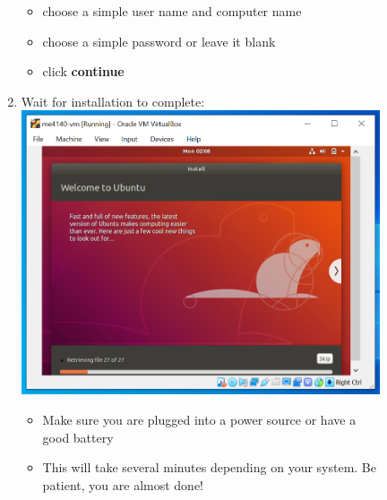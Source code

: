 \documentclass[12pt]{article}
\begin{document}
\begin{description}
\begin{description}
\begin{enumerate}
\begin{itemize}
				 \item choose a simple user name and computer name
				 \item choose a simple password or leave it blank
				 \item click {\bf continue}
                     
            \end{itemize}
\newpage
\item Wait for installation to complete: \vspace{5mm} \\
      		\hspace*{-2.5cm}\includegraphics[scale=.6]{Capture20.png}
            \begin{itemize}
            \item  Make sure you are plugged into a power source or have a good battery
        \item  This will take several minutes depending on your system. Be patient, you are almost done! \vspace{5mm} \\
    \end{itemize} 


\end{enumerate}
\end{description}
\end{description}
\end{document}
